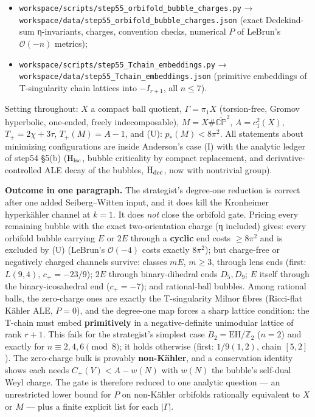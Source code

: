 \documentclass[
  10pt,
]{report}
\providecommand{\tightlist}{%
  \setlength{\itemsep}{0pt}\setlength{\parskip}{0pt}}
\begin{document}
\begin{itemize}
\tightlist
\item
  \texttt{workspace/scripts/step55\_orbifold\_bubble\_charges.py} →
  \texttt{workspace/data/step55\_orbifold\_bubble\_charges.json} (exact
  Dedekind-sum η-invariants, charges, convention checks, numerical \(P\)
  of LeBrun's \(\mathcal O(-n)\) metrics);
\item
  \texttt{workspace/scripts/step55\_Tchain\_embeddings.py} →
  \texttt{workspace/data/step55\_Tchain\_embeddings.json} (primitive
  embeddings of T-singularity chain lattices into \(-I_{r+1}\), all
  \(n\le7\)).
\end{itemize}

Setting throughout: \(X\) a compact ball quotient, \(\Gamma=\pi_1X\)
(torsion-free, Gromov hyperbolic, one-ended, freely indecomposable),
\(M=X\#\overline{\mathbb{CP}}^2\), \(A=c_1^2(X)\), \(T_+=2\chi+3\tau\),
\(T_+(M)=A-1\), and (U): \(p_*(M)<8\pi^2\). All statements about
minimizing configurations are inside Anderson's case (I) with the
analytic ledger of step54 §5(b) (\(\mathrm H_{\rm lsc}\), bubble
criticality by compact replacement, and derivative-controlled ALE decay
of the bubbles, \(\mathrm H_{\rm dec}\), now with nontrivial group).

\textbf{Outcome in one paragraph.} The strategist's degree-one reduction
is correct after one added Seiberg--Witten input, and it does kill the
Kronheimer hyperkähler channel at \(k=1\). It does \emph{not} close the
orbifold gate. Pricing every remaining bubble with the exact
two-orientation charge (η included) gives: every orbifold bubble
carrying \(E\) or \(2E\) through a \textbf{cyclic} end costs
\(\ge8\pi^2\) and is excluded by (U) (LeBrun's \(\mathcal O(-4)\) costs
exactly \(8\pi^2\)); but charge-free or negatively charged channels
survive: classes \(mE\), \(m\ge3\), through lens ends (first:
\(L(9,4)\), \(c_+=-23/9\)); \(2E\) through binary-dihedral ends
\(D_5,D_9\); \(E\) itself through the binary-icosahedral end
(\(c_+=-7\)); and rational-ball bubbles. Among rational balls, the
zero-charge ones are exactly the T-singularity Milnor fibres (Ricci-flat
Kähler ALE, \(P=0\)), and the degree-one map forces a sharp lattice
condition: the T-chain must embed \textbf{primitively} in a
negative-definite unimodular lattice of rank \(r+1\). This fails for the
strategist's simplest case \(B_2=\mathrm{EH}/\mathbb Z_2\) (\(n=2\)) and
exactly for \(n\equiv2,4,6\pmod 8\); it holds otherwise (first:
\(1/9(1,2)\), chain \([5,2]\)). The zero-charge bulk is provably
\textbf{non-Kähler}, and a conservation identity shows each needs
\(C_+(V)<A-w(N)\) with \(w(N)\) the bubble's self-dual Weyl charge. The
gate is therefore reduced to one analytic question --- an unrestricted
lower bound for \(P\) on non-Kähler orbifolds rationally equivalent to
\(X\) or \(M\) --- plus a finite explicit list for each \(|\Gamma|\).
\end{document}
